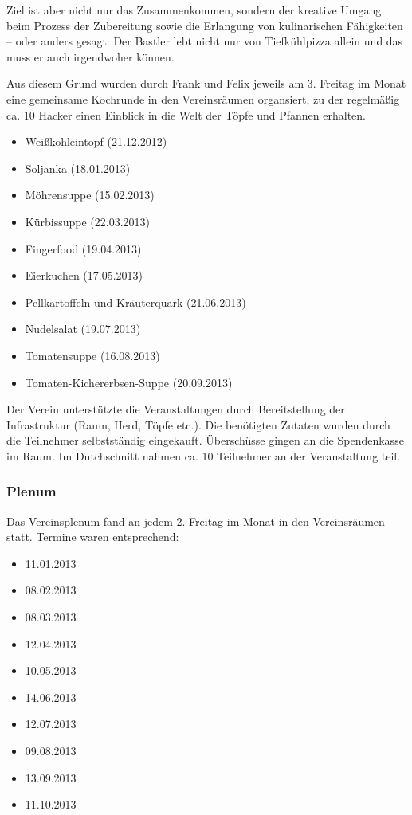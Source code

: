 \documentclass[10pt,DIV16]{scrartcl}
\begin{document}
Ziel ist aber nicht nur das Zusammenkommen, sondern der kreative Umgang
beim Prozess der Zubereitung sowie die Erlangung von kulinarischen
Fähigkeiten -- oder anders gesagt: Der Bastler lebt nicht nur von
Tiefkühlpizza allein und das muss er auch irgendwoher können.

Aus diesem Grund wurden durch Frank und Felix jeweils am 3. Freitag
im Monat eine gemeinsame Kochrunde in den Vereinsräumen organsiert,
zu der regelmäßig ca. 10 Hacker einen Einblick in die Welt der Töpfe
und Pfannen erhalten.

\begin{itemize}
	\item Weißkohleintopf (21.12.2012)
	\item Soljanka (18.01.2013)
	\item Möhrensuppe (15.02.2013)
	\item Kürbissuppe (22.03.2013)
	\item Fingerfood (19.04.2013)
	\item Eierkuchen (17.05.2013)
	\item Pellkartoffeln und Kräuterquark (21.06.2013)
	\item Nudelsalat (19.07.2013)
	\item Tomatensuppe (16.08.2013)
	\item Tomaten-Kichererbsen-Suppe (20.09.2013)
\end{itemize}

Der Verein unterstützte die Veranstaltungen durch Bereitstellung der
Infrastruktur (Raum, Herd, Töpfe etc.). Die benötigten Zutaten wurden
durch die Teilnehmer selbstständig eingekauft. Überschüsse gingen an
die Spendenkasse im Raum. Im Dutchschnitt nahmen ca. 10 Teilnehmer an
der Veranstaltung teil.

\subsubsection{Plenum}

Das Vereinsplenum fand an jedem 2. Freitag im Monat in den
Vereinsräumen statt. Termine waren entsprechend:

\begin{itemize}
	\item 11.01.2013
	\item 08.02.2013
	\item 08.03.2013
	\item 12.04.2013
	\item 10.05.2013
	\item 14.06.2013
	\item 12.07.2013
	\item 09.08.2013
	\item 13.09.2013
	\item 11.10.2013
\end{itemize}
\end{document}
